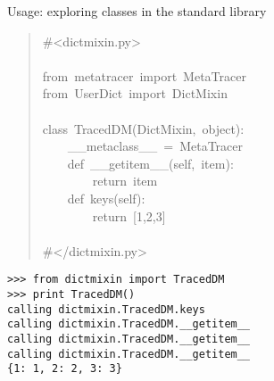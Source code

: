 \documentclass[10pt,a4paper,english]{article}
\begin{document}
Usage: exploring classes in the standard library
\begin{quote}{\ttfamily \raggedright \noindent
{\#}<dictmixin.py>~\\
~\\
from~metatracer~import~MetaTracer~\\
from~UserDict~import~DictMixin~\\
~\\
class~TracedDM(DictMixin,~object):~\\
~~~~{\_}{\_}metaclass{\_}{\_}~=~MetaTracer~\\
~~~~def~{\_}{\_}getitem{\_}{\_}(self,~item):~\\
~~~~~~~~return~item~\\
~~~~def~keys(self):~~\\
~~~~~~~~return~{[}1,2,3]~\\
~\\
{\#}</dictmixin.py>
}\end{quote}
\begin{verbatim}>>> from dictmixin import TracedDM
>>> print TracedDM()
calling dictmixin.TracedDM.keys
calling dictmixin.TracedDM.__getitem__
calling dictmixin.TracedDM.__getitem__
calling dictmixin.TracedDM.__getitem__
{1: 1, 2: 2, 3: 3}\end{verbatim}



\hypertarget{real-life-example-check-overriding}{}
\end{document}
